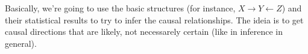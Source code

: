 Basically, we're going to use the basic structures (for instance, $X \rightarrow Y \leftarrow Z$) and their statistical results to try to infer the causal relationships. The ideia is to get causal directions that are likely, not necessarely certain (like in inference in general).
